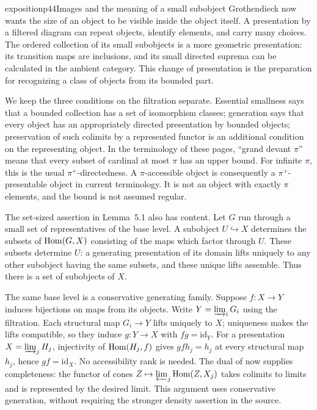 \begin{dcomment}{exposition}{p44}{Images and the meaning of a small subobject}
Grothendieck now wants the size of an object to be visible inside the object itself. A presentation by a filtered diagram can repeat objects, identify elements, and carry many choices. The ordered collection of its small subobjects is a more geometric presentation: its transition maps are inclusions, and its small directed suprema can be calculated in the ambient category. This change of presentation is the preparation for recognizing a class of objects from its bounded part.

We keep the three conditions on the filtration separate. Essential smallness says that a bounded collection has a set of isomorphism classes; generation says that every object has an appropriately directed presentation by bounded objects; preservation of such colimits by a represented functor is an additional condition on the representing object. In the terminology of these pages, ``grand devant $\pi$'' means that every subset of cardinal at most $\pi$ has an upper bound. For infinite $\pi$, this is the usual $\pi^+$-directedness. A $\pi$-accessible object is consequently a $\pi^+$-presentable object in current terminology. It is not an object with exactly $\pi$ elements, and the bound is not assumed regular.

The set-sized assertion in Lemma~5.1 also has content. Let $G$ run through a small set of representatives of the base level. A subobject $U\hookrightarrow X$ determines the subsets of $\operatorname{Hom}(G,X)$ consisting of the maps which factor through $U$. These subsets determine $U$: a generating presentation of its domain lifts uniquely to any other subobject having the same subsets, and these unique lifts assemble. Thus there is a set of subobjects of $X$.

The same base level is a conservative generating family. Suppose $f:X\to Y$ induces bijections on maps from its objects. Write $Y=\varinjlim_iG_i$ using the filtration. Each structural map $G_i\to Y$ lifts uniquely to $X$; uniqueness makes the lifts compatible, so they induce $g:Y\to X$ with $fg=\mathrm{id}_Y$. For a presentation $X=\varinjlim_jH_j$, injectivity of $\operatorname{Hom}(H_j,f)$ gives $gf h_j=h_j$ at every structural map $h_j$, hence $gf=\mathrm{id}_X$. No accessibility rank is needed. The dual of \citep[Expos\'e~I, 8.12.7]{SGA4I1972} now supplies completeness: the functor of cones $Z\mapsto\varprojlim_j\operatorname{Hom}(Z,X_j)$ takes colimits to limits and is represented by the desired limit. This argument uses conservative generation, without requiring the stronger density assertion in the source.


\end{dcomment}
